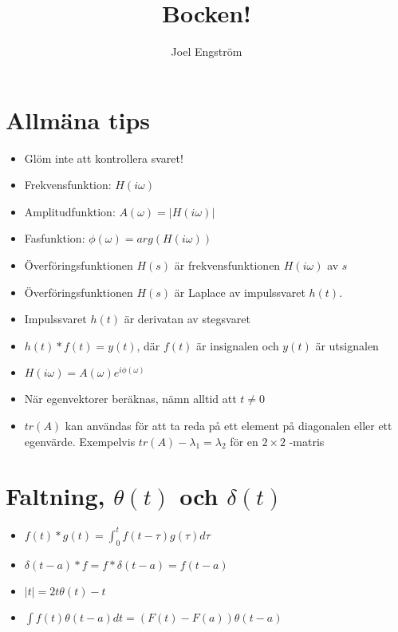 \documentclass[a4paper,11pt]{article}
\title{\vspace{-3.0cm}Bocken!}
\author{Joel Engström}
\begin{document}
\maketitle

\section{Allmäna tips}
\begin{itemize}
\item
  Glöm inte att kontrollera svaret!
\item 
  Frekvensfunktion: $H(i\omega)$
\item 
  Amplitudfunktion: $A(\omega)=|H(i\omega)|$
\item 
  Fasfunktion:      $\phi(\omega)=arg(H(i\omega))$
\item
  Överföringsfunktionen $H(s)$ är frekvensfunktionen $H(i\omega)$ av $s$
\item
  Överföringsfunktionen $H(s)$ är Laplace av impulssvaret $h(t)$.
\item
  Impulssvaret $h(t)$ är derivatan av stegsvaret
\item
  $h(t) * f(t) = y(t)$, där $f(t)$ är insignalen och $y(t)$ är utsignalen
\item
  $H(i\omega)=A(\omega)e^{i\phi(\omega)}$
\item
  När egenvektorer beräknas, nämn alltid att $t \ne 0$
\item
  $tr(A)$ kan användas för att ta reda på ett element på diagonalen eller ett egenvärde. Exempelvis $tr(A) - \lambda_1 = \lambda_2$ för en $2 \times 2$ -matris
\end{itemize}

\section{Faltning, $\theta(t)$ och $\delta(t)$}
\begin{itemize}
\item
  $f(t) * g(t) = \displaystyle\int_0^t f(t - \tau)g(\tau)d\tau$
\item
  $\delta(t-a) * f = f * \delta(t-a) = f(t-a)$
\item
  $|t|=2t\theta(t)-t$
\item
  $\displaystyle\int f(t)\theta(t-a)dt=(F(t)-F(a))\theta(t-a)$
\end{itemize}
  
\end{document}
